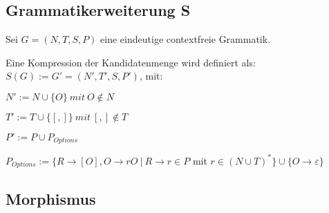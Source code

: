 \documentclass[]{article}
\begin{document}
\subsection{Grammatikerweiterung S}

Sei $G = (N,T,S,P)$ eine eindeutige contextfreie Grammatik.

Eine Kompression der Kandidatenmenge wird definiert als:
\\$S(G) := G' = (N', T', S, P')$, mit:

$N' := N \cup \{ O \}\ mit\ O \notin N$

$T' := T \cup \{[ , ] \}\ mit\ [,] \notin T$


$P' := P
\cup P_{Options} 
$

$P_{Options} := \{R \rightarrow [O], O \rightarrow r O \ \vert\ R\rightarrow r\in P$
mit $r\in (N\cup T)^*\}\cup\{ O \rightarrow \varepsilon \}$





% 

\subsection{Morphismus}
% 
% 
% 
% 
% 
% 
\end{document}
